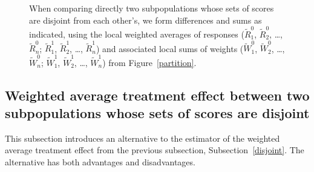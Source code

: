 \documentclass[]{fairmeta}
\begin{document}
\begin{figure}
\begin{center}
\end{center}
%
\caption{When comparing directly two subpopulations whose sets of scores
are disjoint from each other's, we form differences and sums as indicated,
using the local weighted averages of responses
($\tilde{R}_1^0$, $\tilde{R}_2^0$, \dots, $\tilde{R}_n^0$;
$\tilde{R}_1^1$, $\tilde{R}_2^1$, \dots, $\tilde{R}_n^1$)
and associated local sums of weights
($\tilde{W}_1^0$, $\tilde{W}_2^0$, \dots, $\tilde{W}_n^0$;
$\tilde{W}_1^1$, $\tilde{W}_2^1$, \dots, $\tilde{W}_n^1$)
from Figure~\ref{partition}.
}
\label{diffsums}
%
\end{figure}


\subsection{Weighted average treatment effect between two subpopulations
whose sets of scores are disjoint}
\label{altATE}

This subsection introduces an alternative to the estimator
of the weighted average treatment effect from the previous subsection,
Subsection~\ref{disjoint}. The alternative has both advantages
and disadvantages.
\end{document}
